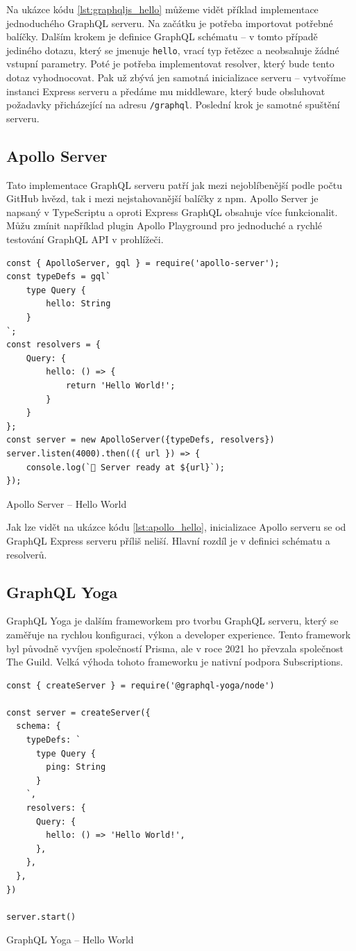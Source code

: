 \documentclass[thesis=M,czech]{FITthesis}[2019/12/23]
\begin{document}
Na ukázce kódu \ref{lst:graphqljs_hello} můžeme vidět příklad implementace jednoduchého GraphQL serveru. Na začátku je potřeba importovat potřebné balíčky. Dalším krokem je definice GraphQL schématu -- v tomto případě jediného dotazu, který se jmenuje \texttt{hello}, vrací typ řetězec a neobsahuje žádné vstupní parametry. Poté je potřeba implementovat resolver, který bude tento dotaz vyhodnocovat. Pak už zbývá jen samotná inicializace serveru -- vytvoříme instanci Express serveru a předáme mu middleware, který bude obsluhovat požadavky přicházející na adresu \texttt{/graphql}. Poslední krok je samotné spuštění serveru.

\subsection{Apollo Server}
Tato implementace GraphQL serveru patří jak mezi nejoblíbenější podle počtu GitHub hvězd, tak i mezi nejstahovanější balíčky z npm. Apollo Server \cite{apollo} je napsaný v TypeScriptu a oproti Express GraphQL obsahuje více funkcionalit. Můžu zmínit například plugin Apollo Playground pro jednoduché a rychlé testování GraphQL API v prohlížeči.

\begin{listing}[H]
\begin{verbatim}
const { ApolloServer, gql } = require('apollo-server');
const typeDefs = gql`
    type Query {
        hello: String
    }
`;
const resolvers = {
    Query: {
        hello: () => {
            return 'Hello World!';
        }
    }
};
const server = new ApolloServer({typeDefs, resolvers})
server.listen(4000).then(({ url }) => {
    console.log(`🚀 Server ready at ${url}`);
});
\end{verbatim}
\caption{Apollo Server -- Hello World}
\label{lst:apollo_hello}
\end{listing}

Jak lze vidět na ukázce kódu \ref{lst:apollo_hello}, inicializace Apollo serveru se od GraphQL Express serveru příliš neliší. Hlavní rozdíl je v definici schématu a resolverů.

\clearpage
\subsection{GraphQL Yoga}
GraphQL Yoga \cite{graphql_yoga} je dalším frameworkem pro tvorbu GraphQL serveru, který se zaměřuje na rychlou konfiguraci, výkon a developer experience. Tento framework byl původně vyvíjen společností Prisma, ale v roce 2021 ho převzala společnost The Guild. Velká výhoda tohoto frameworku je nativní podpora Subscriptions.
\begin{listing}[H]
\begin{verbatim}
const { createServer } = require('@graphql-yoga/node')

const server = createServer({
  schema: {
    typeDefs: `
      type Query {
        ping: String
      }
    `,
    resolvers: {
      Query: {
        hello: () => 'Hello World!',
      },
    },
  },
})

server.start()
\end{verbatim}
\caption{GraphQL Yoga -- Hello World}
\label{lst:yoga_hello}
\end{listing}
\end{document}
